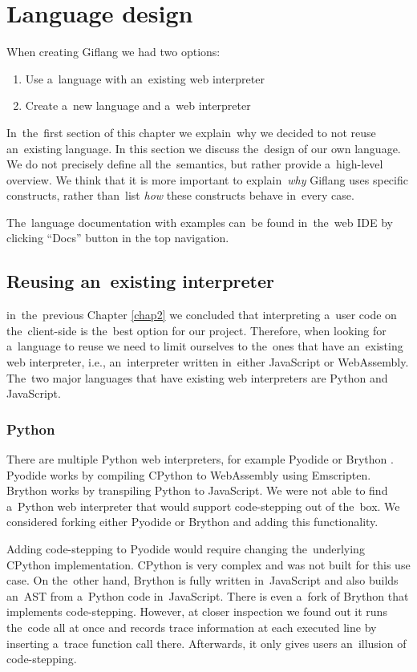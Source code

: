 
\chapter{Language design}
\label{chap3:language_design}

When creating Giflang we had two options:
\begin{enumerate}
    \item Use a~language with an~existing web interpreter
    \item Create a~new language and a~web interpreter
\end{enumerate}

In~the~first section of this chapter we explain~why we decided to not reuse an~existing language. In this section we discuss the~design of our own language. We do not
precisely define all the~semantics, but rather provide a~high-level overview. We think that it is more important to explain~\emph{why} Giflang uses specific
constructs, rather than~list \emph{how} these constructs behave in~every case.

The~language documentation with examples can~be found in~the~web IDE by clicking ``Docs'' button in the top navigation.

\section{Reusing an~existing interpreter}
in~the~previous Chapter \ref{chap2} we concluded that interpreting a~user code on the~client-side is the~best option for our project. Therefore, when
looking for a~language to reuse we need to limit ourselves to the~ones that have an~existing web interpreter, i.e., an~interpreter written in~either
JavaScript or WebAssembly. The~two major languages that have existing web interpreters are Python and JavaScript.

\subsection{Python}
There are multiple Python web interpreters, for example Pyodide \cite{Pyodide} or Brython \cite{Brython}. Pyodide works by compiling CPython \cite{CPython}
to WebAssembly using Emscripten. Brython works by transpiling Python to JavaScript. We were not able to find a~Python web interpreter that would
support code-stepping out of the~box. We considered forking either Pyodide or Brython and adding this functionality.

Adding code-stepping to Pyodide would require changing the~underlying CPy\-thon implementation. CPython is very complex and was not built for this use case.
On the~other hand, Brython is fully written in~JavaScript and also builds an~AST from a~Python code in~JavaScript. There
is even a~fork of Brython \cite{PythonDebugger} that implements code-stepping. However, at closer inspection we found out it runs the~code all at once and records trace information
at each executed line by inserting a~trace function call there. Afterwards, it only gives users an~illusion of code-stepping.

